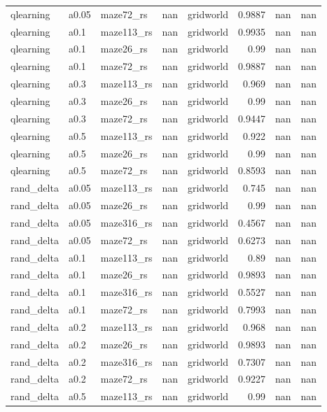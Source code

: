 \begin{table}[t]
\begin{tabular}{lllrrrrr}
qlearning & a0.05 & maze72\_rs & nan & gridworld & 0.9887 & nan & nan \\
qlearning & a0.1 & maze113\_rs & nan & gridworld & 0.9935 & nan & nan \\
qlearning & a0.1 & maze26\_rs & nan & gridworld & 0.99 & nan & nan \\
qlearning & a0.1 & maze72\_rs & nan & gridworld & 0.9887 & nan & nan \\
qlearning & a0.3 & maze113\_rs & nan & gridworld & 0.969 & nan & nan \\
qlearning & a0.3 & maze26\_rs & nan & gridworld & 0.99 & nan & nan \\
qlearning & a0.3 & maze72\_rs & nan & gridworld & 0.9447 & nan & nan \\
qlearning & a0.5 & maze113\_rs & nan & gridworld & 0.922 & nan & nan \\
qlearning & a0.5 & maze26\_rs & nan & gridworld & 0.99 & nan & nan \\
qlearning & a0.5 & maze72\_rs & nan & gridworld & 0.8593 & nan & nan \\
rand\_delta & a0.05 & maze113\_rs & nan & gridworld & 0.745 & nan & nan \\
rand\_delta & a0.05 & maze26\_rs & nan & gridworld & 0.99 & nan & nan \\
rand\_delta & a0.05 & maze316\_rs & nan & gridworld & 0.4567 & nan & nan \\
rand\_delta & a0.05 & maze72\_rs & nan & gridworld & 0.6273 & nan & nan \\
rand\_delta & a0.1 & maze113\_rs & nan & gridworld & 0.89 & nan & nan \\
rand\_delta & a0.1 & maze26\_rs & nan & gridworld & 0.9893 & nan & nan \\
rand\_delta & a0.1 & maze316\_rs & nan & gridworld & 0.5527 & nan & nan \\
rand\_delta & a0.1 & maze72\_rs & nan & gridworld & 0.7993 & nan & nan \\
rand\_delta & a0.2 & maze113\_rs & nan & gridworld & 0.968 & nan & nan \\
rand\_delta & a0.2 & maze26\_rs & nan & gridworld & 0.9893 & nan & nan \\
rand\_delta & a0.2 & maze316\_rs & nan & gridworld & 0.7307 & nan & nan \\
rand\_delta & a0.2 & maze72\_rs & nan & gridworld & 0.9227 & nan & nan \\
rand\_delta & a0.5 & maze113\_rs & nan & gridworld & 0.99 & nan & nan \\

\end{tabular}
\end{table}
